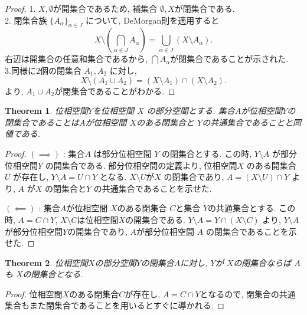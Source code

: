 \documentclass[lualatex]{ltjsbook}
\newtheorem{theorem}{Theorem}[chapter]
\theoremstyle{remark}
\theoremstyle{plain}
\begin{document}
\begin{proof}
	1. $X, \emptyset$が開集合であるため,  補集合 $\emptyset , X$が閉集合である.\\
	2. 閉集合族 $\{A_{\alpha}\}_{\alpha \in J} $ について,  DeMorgan則を適用すると
	\[
	X\setminus \left( \bigcap_{\alpha \in J} A_{\alpha}\right) = \bigcup_{\alpha \in J} \left( X\setminus A_{\alpha} \right) 
	.\] 
	右辺は開集合の任意和集合であるから,  $\bigcap A_{\alpha}$が閉集合であることが示された.\\
	3.同様に$2$個の閉集合 $A_1,  A_2$ に対し,  
	\[
	X\setminus \left(A_1 \cup A_2 \right) = \left( X \setminus A_1 \right) \cap \left( X \setminus A_2 \right) 
	.\] 
	より,  $A_1 \cup A_2$が閉集合であることがわかる.

\end{proof}

\begin{theorem}
	位相空間$Y$を位相空間 $X$ の部分空間とする. 集合$A$が位相空間$Y$の閉集合であることは$A$が位相空間 $X$のある閉集合と $Y$の共通集合であることと同値である.	
\end{theorem}

\begin{proof}
	$\left( \implies \right) $ : 集合$A$ は部分位相空間 $Y$ の閉集合とする. 
	この時,  $Y\setminus A$ が部分位相空間$Y$ の開集合である.
	部分位相空間の定義より,  位相空間$X$ のある開集合 $U$ が存在し,  $Y\setminus A = U \cap Y$ となる. 
	$X\setminus U$が$X$ の閉集合であり,  $A = \left( X \setminus U \right) \cap Y$ より,  $A$ が$X$ の閉集合と$Y$ の共通集合であることを示せた.
	
	$\left( \impliedby \right) $ : 集合$A$が位相空間 $X$のある閉集合 $C$と集合 $Y$の共通集合とする.
	この時,  $A=C\cap Y$,   $X\setminus C$は位相空間$X$の開集合である.
	$Y\setminus A = Y\cap \left( X \setminus C \right) $  より,  $Y\setminus A$が部分位相空間$Y$の開集合であり,   $A$が部分位相空間 $A$ の閉集合であることを示せた.
\end{proof}

\begin{theorem}
\label{the:closedset}
	位相空間$X$の部分空間$Y$の閉集合$A$に対し,   $Y$が $X$の閉集合ならば $A$も $X$の閉集合となる.
\end{theorem}

\begin{proof}
	位相空間$X$のある閉集合$C$が存在し,  $A = C\cap Y$となるので,  閉集合の共通集合もまた閉集合であることを用いるとすぐに導かれる.
\end{proof}
\end{document}
